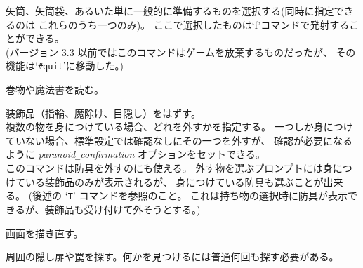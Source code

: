 \item[\tb{Q}]
矢筒、矢筒袋、あるいた単に一般的に準備するものを選択する(同時に指定できるのは
これらのうち一つのみ)。
ここで選択したものは`f'コマンドで発射することができる。\\
(バージョン 3.3 以前ではこのコマンドはゲームを放棄するものだったが、
その機能は`{\tt \#quit}'に移動した。)
\item[\tb{r}]
巻物や魔法書を読む。
\item[\tb{R}]
装飾品（指輪、魔除け、目隠し）をはずす。\\
複数の物を身につけている場合、どれを外すかを指定する。
一つしか身につけていない場合、標準設定では確認なしにその一つを外すが、
確認が必要になるように
{\it paranoid\verb+_+confirmation\/}
オプションをセットできる。\\
このコマンドは防具を外すのにも使える。
外す物を選ぶプロンプトには身につけている装飾品のみが表示されるが、
身につけている防具も選ぶことが出来る。
(後述の `{\tt T}' コマンドを参照のこと。
これは持ち物の選択時に防具が表示できるが、装飾品も受け付けて外そうとする。)
\item[\tb{\^{}R}]
画面を描き直す。
\item[\tb{s}]
周囲の隠し扉や罠を探す。何かを見つけるには普通何回も探す必要がある。\\
